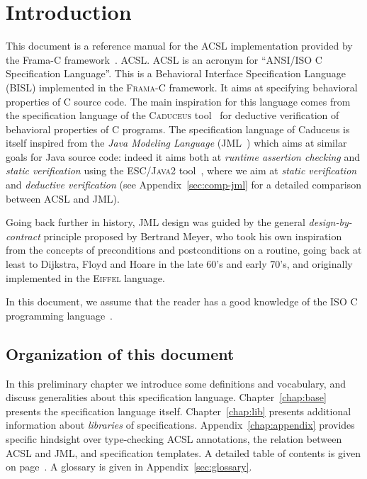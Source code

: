 \chapter{Introduction}

This document is a reference manual for
%
{the ACSL implementation provided by the Frama-C
  framework~\cite{frama-c}.}%
{ACSL.}
ACSL is an acronym for ``ANSI/ISO C
Specification Language''. This is a Behavioral Interface Specification
Language (BISL) implemented in the \textsc{Frama-C} framework.
It aims at specifying behavioral properties of C
source code. The main inspiration for this language comes from the
specification language of the \textsc{Caduceus}
tool~\cite{filliatre04icfem,filliatre07cav} for deductive verification
of behavioral properties of C programs. The specification language of
Caduceus is itself inspired from the
\emph{Java Modeling Language} (JML~\cite{leavens00jml}) which aims at
similar goals for Java source code: indeed it aims both at
\emph{runtime assertion checking} and \emph{static verification} using
the \textsc{ESC/Java2} tool~\cite{ESCJava2}, where we aim at
\emph{static verification} and \emph{deductive verification} (see
Appendix~\ref{sec:comp-jml} for a detailed comparison between ACSL and
JML).

Going back further in history, JML design was guided by the general
\emph{design-by-contract} principle proposed by Bertrand Meyer, who
took his own inspiration from the concepts of preconditions and
postconditions on a routine, going back at least to Dijkstra, Floyd and
Hoare in the late 60's and early 70's, and originally implemented in
the \textsc{Eiffel} language.

In this document, we assume that the reader has a good knowledge of
the ISO C programming language~\cite{KR88,standardc99}.

\section{Organization of this document}

In this preliminary chapter we introduce some definitions and
vocabulary, and discuss generalities about this specification
language.  Chapter~\ref{chap:base} presents the specification language
itself.  Chapter~\ref{chap:lib} presents additional information about
\emph{libraries} of specifications. Appendix~\ref{chap:appendix} provides
specific hindsight over type-checking ACSL annotations, 
the relation between ACSL and JML, and specification templates.
A detailed table of
contents is given on page~\pageref{chap:contents}.
A glossary is given in Appendix~\ref{sec:glossary}.

